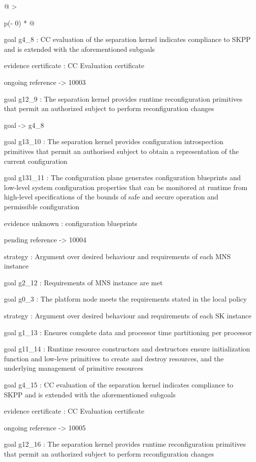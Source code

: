 \documentclass[12pt,twoside,a4paper]{article}
\begin{document}
\begin{longtable}[]{@{}
  >{\raggedright\arraybackslash}p{(\columnwidth - 0\tabcolsep) * }@{}}
\begin{minipage}[b]{\linewidth}
goal g4\_8 : CC evaluation of the separation kernel indicates compliance to SKPP and is extended with the aforementioned subgoals

evidence certificate : CC Evaluation certificate

ongoing reference -\textgreater{} 10003

goal g12\_9 : The separation kernel provides runtime reconfiguration primitives that permit an authorized subject to perform reconfiguration changes

goal -\textgreater{} g4\_8

goal g13\_10 : The separation kernel provides configuration introspection primitives that permit an authorised subject to obtain a representation of the current configuration

goal g131\_11 : The configuration plane generates configuration blueprints and low-level system configuration properties that can be monitored at runtime from high-level specifications of the bounds of safe and secure operation and permissible configuration

evidence unknown : configuration blueprints

pending reference -\textgreater{} 10004

strategy : Argument over desired behaviour and requirements of each MNS instance

goal g2\_12 : Requirements of MNS instance are met

goal g0\_3 : The platform node meets the requirements stated in the local policy

strategy : Argument over desired behaviour and requirements of each SK instance

goal g1\_13 : Ensures complete data and processor time partitioning per processor

goal g11\_14 : Runtime resource constructors and destructors ensure initialization function and low-leve primitives to create and destroy resources, and the underlying management of primitive resources

goal g4\_15 : CC evaluation of the separation kernel indicates compliance to SKPP and is extended with the aforementioned subgoals

evidence certificate : CC Evaluation certificate

ongoing reference -\textgreater{} 10005

goal g12\_16 : The separation kernel provides runtime reconfiguration primitives that permit an authorized subject to perform reconfiguration changes


\end{minipage}
\end{longtable}
\end{document}
